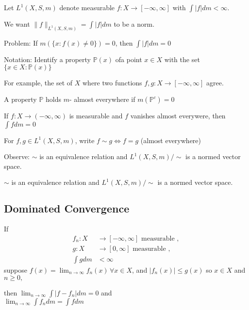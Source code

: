 Let $L^{1}(X,S, m)$ denote measurable $f: X \to [-\infty, \infty]$ with $\int | f| dm < \infty$.

We want $\|f\|_{L^{1}(X,S, m)} = \int |f| dm$ to be a norm.

Problem: If $m(\{x : f(x) \neq 0 \}) = 0$, then $\int |f| dm = 0$

\begin{remark}
	Notation: Identify a property $\mathbb{P}(x)$ ofa point $x \in X$ with the set $\{x \in X : \mathbb{P}(x)\}$
\end{remark}

For example, the set of $X$ where two functions  $f,g : X \to [-\infty, \infty]$ agree.

A property $\mathbb{P}$ holds $m$- almost everywhere if $m(\mathbb{P}^{c}) = 0$

\begin{example}
	If $f : X \to (-\infty, \infty)$ is measurable and $f$ vanishes almost everywere, then $\int f dm = 0$
\end{example}


For $f,g \in L^{1}(X,S, m)$, write $f \sim g \iff f=g$ (almost everywhere)

Observe: $\sim$ is an equivalence relation and $L^{1}(X,S, m) / \sim$ is a normed vector space.

\begin{observation}
  $\sim$ is an equivalence relation and $L^{1}(X,S, m) / \sim$ is a normed vector space.
\end{observation}

\subsection{Dominated Convergence}

\begin{definition}
	If
	\begin{align*}
		f_n : X &\to [-\infty, \infty] \text{ measurable }, \\
		g : X &\to [0, \infty] \text{ measurable }, \\
		\int g dm &< \infty
	\end{align*}
	suppose $f(x) = \lim_{n \to \infty} f_n(x)\, \forall x \in X$, and $|f_n (x) | \leq g(x)$ so
	$x \in X$ and $n \geq 0,$

	then  $\lim_{n\to \infty} \int | f - f_n | dm = 0$ and \\
	$\lim_{n\to \infty} \int f_n dm = \int f dm$

\end{definition}


